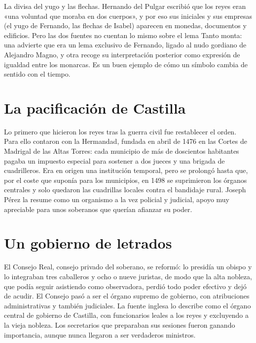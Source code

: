 \documentclass{book}
\begin{document}

La divisa del yugo y las flechas. Hernando del Pulgar escribió que los reyes eran «una voluntad que moraba en dos cuerpos», y por eso sus iniciales y sus empresas (el yugo de Fernando, las flechas de Isabel) aparecen en monedas, documentos y edificios. Pero las dos fuentes no cuentan lo mismo sobre el lema Tanto monta: una advierte que era un lema exclusivo de Fernando, ligado al nudo gordiano de Alejandro Magno, y otra recoge su interpretación posterior como expresión de igualdad entre los monarcas. Es un buen ejemplo de cómo un símbolo cambia de sentido con el tiempo.


\section{La pacificación de Castilla}

Lo primero que hicieron los reyes tras la guerra civil fue restablecer el orden. Para ello contaron con la Hermandad, fundada en abril de 1476 en las Cortes de Madrigal de las Altas Torres: cada municipio de más de doscientos habitantes pagaba un impuesto especial para sostener a dos jueces y una brigada de cuadrilleros. Era en origen una institución temporal, pero se prolongó hasta que, por el coste que suponía para los municipios, en 1498 se suprimieron los órganos centrales y solo quedaron las cuadrillas locales contra el bandidaje rural. Joseph Pérez la resume como un organismo a la vez policial y judicial, apoyo muy apreciable para unos soberanos que querían afianzar su poder.


\section{Un gobierno de letrados}

El Consejo Real, consejo privado del soberano, se reformó: lo presidía un obispo y lo integraban tres caballeros y ocho o nueve juristas, de modo que la alta nobleza, que podía seguir asistiendo como observadora, perdió todo poder efectivo y dejó de acudir. El Consejo pasó a ser el órgano supremo de gobierno, con atribuciones administrativas y también judiciales. La fuente inglesa lo describe como el órgano central de gobierno de Castilla, con funcionarios leales a los reyes y excluyendo a la vieja nobleza. Los secretarios que preparaban sus sesiones fueron ganando importancia, aunque nunca llegaron a ser verdaderos ministros.
\end{document}
